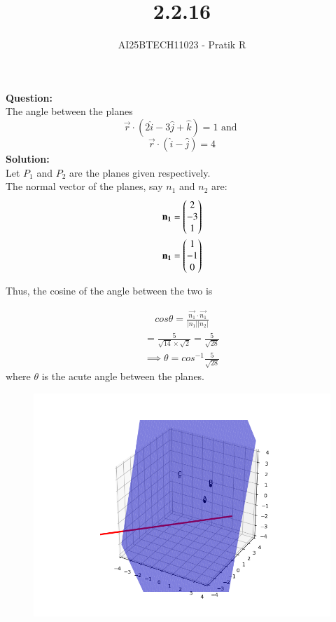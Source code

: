 \documentclass[journal]{IEEEtran}
\begin{document}

\vspace{3cm}

\title{2.2.16}
\author{AI25BTECH11023 - Pratik R}
{\let\newpage\relax\maketitle}

\renewcommand{\thefigure}{\theenumi}
\renewcommand{\thetable}{\theenumi}
\setlength{\intextsep}{10pt} 


\renewcommand{\thetable}{\theenumi}

\textbf{Question: }\\
The angle between the planes
$$
\vec{r} \cdot (2\hat{i}-3\hat{j}+\hat{k})=1 \text{ and } 
$$
$$
\vec{r} \cdot(\hat{i}-\hat{j})=4
$$
\textbf{Solution: } \\
Let $P_1$ and $P_2$ are the planes given respectively. \\
The normal vector of the planes, say $n_1$ and $n_2$ are:
\begin{align}
    \mathbf{n_1}= \begin{pmatrix}2 \\ -3 \\ 1\end{pmatrix} \\
    \mathbf{n_1}= \begin{pmatrix}1 \\ -1 \\ 0\end{pmatrix}
\end{align}

Thus, the cosine of the angle between the two is


\begin{align}
   cos\theta = \frac{\vec{n_1} \cdot \vec{n_1}}{|n_1||n_2|}  
\end{align}
\begin{align}
    = \frac{5}{\sqrt{14}\times\sqrt{2}} = \frac{5}{\sqrt{28}}
\end{align}
\begin{align}
    \implies \theta = cos^{-1}\frac{5}{\sqrt{28}}
\end{align}
where $\theta$ is the acute angle between the planes.

\begin{figure}[H]
    \centering
    \includegraphics[width=0.7\columnwidth]{figs/fig.png}
    \caption*{}
\end{figure}
\end{document}
